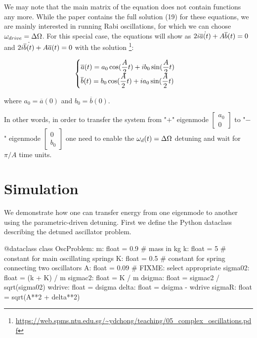 We may note that the main matrix of the equation does not contain functions any more. While the
paper contains the full solution (19) for these equations, we are mainly interested in running Rabi
oscillations, for which we can choose $\omega_{drive} = \Delta\Omega$. For this special case, the equations will show
as $2i \dot{\overline{a}(t)} + A \overline{b}(t) = 0$ and $2i \dot{\overline{b}(t)} + A \overline{a}(t) = 0$ with the solution
\footnote{\url{https://web.spms.ntu.edu.sg/~ydchong/teaching/05_complex_oscillations.pdf}}:

\[
  \begin{cases}
    \displaystyle \overline{a}(t) = a_0 \cos(\frac{A}{2}t) + i b_0 \sin(\frac{A}{2}t) \\
    \displaystyle \overline{b}(t) = b_0 \cos(\frac{A}{2}t) + i a_0 \sin(\frac{A}{2}t)
  \end{cases}
\]

where $a_0 = \overline{a}(0)$ and $b_0 = \overline{b}(0)$.

In other words, in order to transfer the system from "$+$" eigenmode $\begin{bmatrix}a_0 \\
0\end{bmatrix}$ to "$-$" eigenmode $\begin{bmatrix}0 \\ b_0\end{bmatrix}$ one need to enable the
$\omega_d(t) = \Delta\Omega$ detuning and wait for $\pi/A$ time units.

\section{Simulation}

We demonstrate how one can transfer energy from one eigenmode to another using the parametric-driven
detuning. First we define the Python dataclass describing the detuned ascillator problem.

  \begin{python}
  @dataclass
  class OscProblem:
    m:       float = 0.9   # mass in kg
    k:       float = 5     # constant for main oscillating springs
    K:       float = 0.5   # constant for spring connecting two oscillators
    A:       float = 0.09  # FIXME: select appropriate
    sigma02: float = (k + K) / m
    sigmac2: float = K / m
    dsigma:  float = sigmac2 / sqrt(sigma02)
    wdrive:  float = dsigma
    delta:   float = dsigma - wdrive
    sigmaR:  float = sqrt(A**2 + delta**2)
  \end{python}


